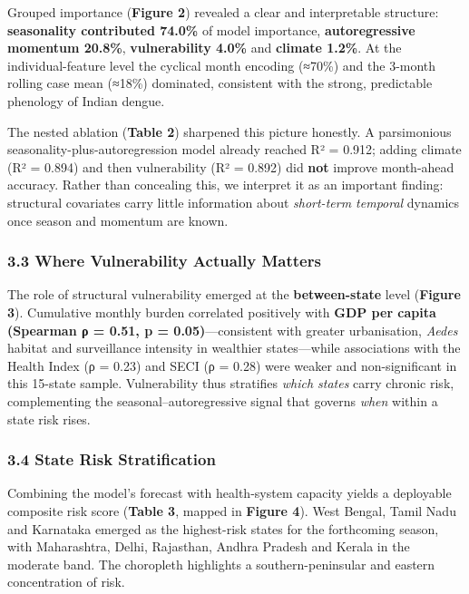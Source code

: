 \documentclass[
  10pt,
  twocolumn]{article}
\begin{document}
Grouped importance (\textbf{Figure 2}) revealed a clear and
interpretable structure: \textbf{seasonality contributed 74.0\%} of
model importance, \textbf{autoregressive momentum 20.8\%},
\textbf{vulnerability 4.0\%} and \textbf{climate 1.2\%}. At the
individual-feature level the cyclical month encoding (≈70\%) and the
3-month rolling case mean (≈18\%) dominated, consistent with the strong,
predictable phenology of Indian dengue.

The nested ablation (\textbf{Table 2}) sharpened this picture honestly.
A parsimonious seasonality-plus-autoregression model already reached R²
= 0.912; adding climate (R² = 0.894) and then vulnerability (R² = 0.892)
did \textbf{not} improve month-ahead accuracy. Rather than concealing
this, we interpret it as an important finding: structural covariates
carry little information about \emph{short-term temporal} dynamics once
season and momentum are known.

\subsubsection{3.3 Where Vulnerability Actually
Matters}\label{where-vulnerability-actually-matters}

The role of structural vulnerability emerged at the
\textbf{between-state} level (\textbf{Figure 3}). Cumulative monthly
burden correlated positively with \textbf{GDP per capita (Spearman ρ =
0.51, p = 0.05)}---consistent with greater urbanisation, \emph{Aedes}
habitat and surveillance intensity in wealthier states---while
associations with the Health Index (ρ = 0.23) and SECI (ρ = 0.28) were
weaker and non-significant in this 15-state sample. Vulnerability thus
stratifies \emph{which states} carry chronic risk, complementing the
seasonal--autoregressive signal that governs \emph{when} within a state
risk rises.

\subsubsection{3.4 State Risk
Stratification}\label{state-risk-stratification}

Combining the model's forecast with health-system capacity yields a
deployable composite risk score (\textbf{Table 3}, mapped in
\textbf{Figure 4}). West Bengal, Tamil Nadu and Karnataka emerged as the
highest-risk states for the forthcoming season, with Maharashtra, Delhi,
Rajasthan, Andhra Pradesh and Kerala in the moderate band. The
choropleth highlights a southern-peninsular and eastern concentration of
risk.
\end{document}
